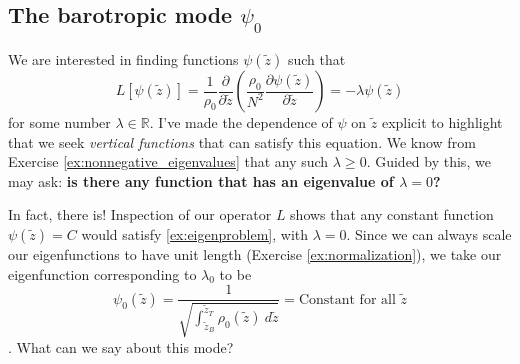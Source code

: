 \documentclass{article}
\numberwithin{equation}{section}
\newcommand{\z}{\tilde{z}}
\begin{document}
\subsection{The barotropic mode $\psi_0$}
We are interested in finding functions $\psi(\z)$ such that 
\begin{equation}
  \label{ex:eigenproblem}
  L[\psi(\z)] = \frac{1}{\rho_0}\frac{\partial}{\partial\z}\left(\frac{\rho_0}{N^2}\frac{\partial\psi(\z)}{\partial\z}\right) = -\lambda \psi(\z)
\end{equation}
for some number $\lambda\in\mathbb{R}$. I've made the dependence of $\psi$ on $\z$ explicit to highlight that we seek \textit{vertical functions} that can satisfy this equation. We know from Exercise \ref{ex:nonnegative_eigenvalues} that any such $\lambda\geq0$. Guided by this, we may ask: \textbf{is there any function that has an eigenvalue of $\lambda=0$?} 
\par In fact, there is! Inspection of our operator $L$ shows that any constant function $\psi(\z)=C$ would satisfy \ref{ex:eigenproblem}, with $\lambda=0$. Since we can always scale our eigenfunctions to have unit length (Exercise \ref{ex:normalization}), we take our eigenfunction corresponding to $\lambda_0$ to be 
\begin{equation}
  \label{ex:barotropic_mode}
  \boxed{
    \psi_0(\z) = \frac{1}{\sqrt{\int_{\z_B}^{\z_T}\rho_0(\z)\ d\z}} = \text{Constant for all $\z$}
  }
\end{equation}. What can we say about this mode?
\end{document}
